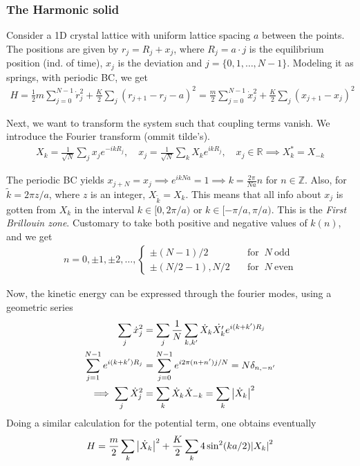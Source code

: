\documentclass[a4paper, english, 12pt]{article}
\newcommand{\curly}[1]{\{ #1 \} }
\begin{document}
\begin{multicols*}{2}
\subsubsection*{The Harmonic solid}
Consider a 1D crystal lattice with uniform lattice spacing $a$ between the points. The positions are given by $r_j = R_j + x_j$, where $R_j=a\cdot j$ is the equilibrium position (ind. of time), $x_j$ is the deviation and $j=\curly{0,1,\dots,N-1}$. Modeling it as springs, with periodic BC, we get 
\begin{align*}
    H = \frac{1}{2} m \sum_{j=0}^{N-1} \dot{r}_j^2 + \frac{K}{2} \sum_j (r_{j+1} - r_j - a)^2 = \frac{m}{2}\sum_{j=0}^{N-1} \dot{x}_j^2 + \frac{K}{2} \sum_j (x_{j+1}-x_j)^2
\end{align*}

Next, we want to transform the system such that coupling terms vanish. We introduce the Fourier transform (ommit tilde's).
\begin{align*}
    X_k = \frac{1}{\sqrt{N}} \sum_j x_j e^{-ikR_j},\quad x_j = \frac{1}{\sqrt{N}} \sum_k X_k e^{ikR_j},\quad x_j\in\mathbb{R}\implies X_k^* = X_{-k}
\end{align*}

The periodic BC yields $x_{j+N}=x_j\implies e^{ikNa}=1\implies k = \frac{2\pi}{Na}n$ for $n\in\mathbb{Z}$. Also, for $\tilde{k}=2\pi z/a$, where $z$ is an integer, $X_{\tilde{k}}=X_k$. This means that all info about $x_j$ is gotten from $X_k$ in the interval $k\in[0,2\pi/a)$ or $k\in[-\pi/a,\pi/a)$. This is the \textit{First Brillouin zone}. Customary to take both positive and negative values of $k(n)$, and we get 
\begin{align*}
    n = 0,\pm1,\pm2,\dots, \begin{cases}
        \pm(N-1)/2 \quad&\text{for }\: N\: \text{odd} \\ 
        \pm(N/2-1),N/2\quad&\text{for }\: N\: \text{even}
    \end{cases}
\end{align*}


Now, the kinetic energy can be expressed through the fourier modes, using a geometric series 
\begin{align*}
    \sum_j \dot{x}_j^2 &= \sum_j \frac{1}{N}\sum_{k,k'}\dot{X}_k \dot{X_k'} e^{i(k+k')R_j} \\ 
    \sum_{j=1}^{N-1} e^{i(k+k')R_j} &= \sum_{j=0}^{N-1}e^{i2\pi(n+n') j/N} = N\delta_{n,-n'} \\ 
    \implies \sum_j \dot{X}_j^2 &= \sum_k \dot{X}_k \dot{X}_{-k} = \sum_k \abs{\dot{X}_k}^2 
\end{align*}
Doing a similar calculation for the potential term, one obtains eventually 
\begin{align*}
    H = \frac{m}{2} \sum_k \abs{\dot{X}_k}^2 + \frac{K}{2} \sum_k 4\sin^2(ka/2) \abs{X_k}^2
\end{align*}


\end{multicols*}
\end{document}
